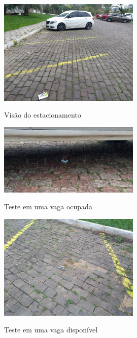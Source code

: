 \documentclass[oneside,openright,12pt]{ufsm_2015} %
\begin{document}
    \begin{figure}[H]
     	    \caption{\label{exepretex} Visão do estacionamento}
            \centering
            \includegraphics[width=0.6\textwidth]{figuras/estacionamento_visao.jpg}
            \vspace{\baselineskip} %
            \label{fig:estac-visao}
    \end{figure}
    
    \begin{figure}[H]
     	    \caption{\label{exepretex} Teste em uma vaga ocupada}
            \centering
            \includegraphics[width=0.6\textwidth]{figuras/ocupada.png}
            \vspace{\baselineskip} %
            \label{fig:ocupada}
    \end{figure}
    
    \begin{figure}[H]
     	    \caption{\label{exepretex} Teste em uma vaga disponível}
            \centering
            \includegraphics[width=0.6\textwidth]{figuras/disponivel.jpg}
            \vspace{\baselineskip} %
            \label{fig:disponivel}
    \end{figure}
    
\end{document}
